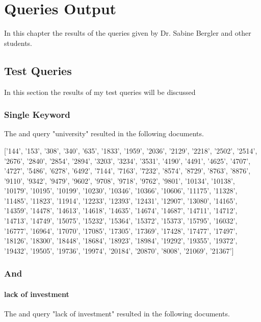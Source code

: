 \chapter{Queries Output}

\par In this chapter the results of the queries given by Dr. Sabine Bergler and other students.

\section{Test Queries}

In this section the results of my test queries will be discussed

\subsection{Single Keyword}

\par The and query "university" resulted in the following documents.
\begin{center}
    ['144', '153', '308', '340', '635', '1833', '1959', '2036', '2129', '2218', '2502', '2514', '2676', '2840', '2854', '2894', '3203', '3234', '3531', '4190', '4491', '4625', '4707', '4727', '5486', '6278', '6492', '7144', '7163', '7232', '8574', '8729', '8763', '8876', '9110', '9342', '9479', '9602', '9708', '9718', '9762', '9801', '10134', '10138', '10179', '10195', '10199', '10230', '10346', '10366', '10606', '11175', '11328', '11485', '11823', '11914', '12233', '12393', '12431', '12907', '13080', '14165', '14359', '14478', '14613', '14618', '14635', '14674', '14687', '14711', '14712', '14713', '14749', '15075', '15232', '15364', '15372', '15373', '15795', '16032', '16777', '16964', '17070', '17085', '17305', '17369', '17428', '17477', '17497', '18126', '18300', '18448', '18684', '18923', '18984', '19292', '19355', '19372', '19432', '19505', '19736', '19974', '20184', '20870', '8008', '21069', '21367']
\end{center}

\subsection{And}

\subsubsection{lack of investment}

\par The and query "lack of investment" resulted in the following documents.

